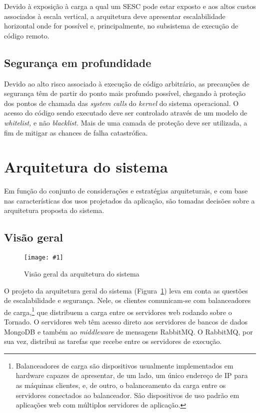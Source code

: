 \documentclass[ruledheader, 12pt]{abnt}
\newcommand{\figcustom}[4]{\par
	\begin{figure}[#3]
		\centering
		\texttt{[image: \#1]}
		\caption{\label{fig:#1}#2}
	\end{figure}
\par}
\newcommand{\figref}[1]{(Figura~\ref{fig:#1})}
\begin{document}
Devido à exposição à carga a qual um SESC pode estar exposto e aos altos custos associados à escala vertical, a arquitetura deve apresentar escalabilidade horizontal onde for possível e, principalmente, no subsistema de execução de código remoto.

\subsection{Segurança em profundidade}

Devido ao alto risco associado à execução de código arbitrário, as precauções de segurança têm de partir do ponto mais profundo possível, chegando à proteção dos pontos de chamada das \emph{system calls} do \emph{kernel} do sistema operacional. O acesso do código sendo executado deve ser controlado através de um modelo de \emph{whitelist,} e não \emph{blacklist.} Mais de uma camada de proteção deve ser utilizada, a fim de mitigar as chances de falha catastrófica.

\section{Arquitetura do sistema}

Em função do conjunto de considerações e estratégias arquiteturais, e com base nas características dos usos projetados da aplicação, são tomadas decisões sobre a arquitetura proposta do sistema.

\subsection{Visão geral}

\afterpage{\clearpage}
\figcustom{architecture}{Visão geral da arquitetura do sistema}{bp}{.9}
O projeto da arquitetura geral do sistema \figref{architecture} leva em conta as questões de escalabilidade e segurança. Nele, os clientes comunicam-se com balanceadores de carga,\footnote{Balanceadores de carga são dispositivos usualmente implementados em hardware capazes de apresentar, de um lado, um único endereço de IP para as máquinas clientes, e, de outro, o balanceamento da carga entre os servidores conectados ao balanceador. São dispositivos de uso padrão em aplicações web com múltiplos servidores de aplicação.} que distribuem a carga entre os servidores web rodando sobre o Tornado. O servidores web têm acesso direto aos servidores de bancos de dados MongoDB e também ao \emph{middleware} de mensagens RabbitMQ. O RabbitMQ, por sua vez, distribui as tarefas que recebe entre os servidores de execução.
\end{document}
